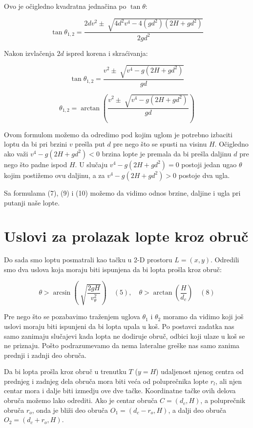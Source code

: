 \documentclass[a4paper, 12pt]{article}
\begin{document}
Ovo je očigledno kvadratna jednačina po $\tan \theta$:

\[ \tan \theta_{1,2} = \dfrac{2 d v^2 \pm \sqrt[]{4 d^2 v^4 - 4 (g d^2)(2 H + g d^2)}}{2 g d^2} \]

Nakon izvlačenja $2d$ ispred korena i skraćivanja:

\[ \tan \theta_{1,2} = \dfrac{v^2 \pm \sqrt[]{v^4 - g(2 H + g d^2)}}{g d} \]

\begin{equation}
\theta_{1,2} = \arctan (\dfrac{v^2 \pm \sqrt[]{v^4 - g(2 H + g d^2)}}{g d})
\end{equation}

Ovom formulom možemo da odredimo pod kojim uglom je potrebno izbaciti loptu da bi pri brzini $v$ prešla put $d$ pre nego što se spusti na visinu $H$.
Očigledno ako važi $v^4 - g(2 H + g d^2) < 0$ brzina lopte je premala da bi prešla daljinu $d$ pre nego što padne ispod $H$. U slučaju $v^4 - g(2 H + g d^2) = 0$ postoji jedan ugao $\theta$ kojim postižemo ovu daljinu, a za $v^4 - g(2 H + g d^2) > 0$ postoje dva ugla.


Sa formulama (7), (9) i (10) možemo da vidimo odnos brzine, daljine i ugla pri putanji naše lopte.

\pagebreak



\section{Uslovi za prolazak lopte kroz obruč}

Do sada smo loptu posmatrali kao tačku u 2-D prostoru $L = (x,y)$. Odredili smo dva uslova koja moraju biti ispunjena da bi lopta prošla kroz obruč:

\[{\theta} > \arcsin(\sqrt[]{\dfrac{2 g H}{v_{\theta}^2}}) \quad (5), \quad {\theta} > \arctan(\dfrac{H}{d_c}) \quad (8) \]

Pre nego što se pozabavimo traženjem uglova $\theta_1$ i $\theta_2$ moramo da vidimo koji još uslovi moraju biti ispunjeni da bi lopta upala u koš. Po postavci zadatka nas samo zanimaju slučajevi kada lopta ne dodiruje obruč, odbici koji ulaze u koš se ne priznaju. Pošto podrazumevamo da nema lateralne greške nas samo zanima prednji i zadnji deo obruča.

Da bi lopta prošla kroz obruč u trenutku $T$ ($y = H$) udaljenost njenog centra od prednjeg i zadnjeg dela obruča mora biti veća od poluprečnika lopte $r_l$, ali njen centar mora i dalje biti izmedju ove dve tačke. Koordinatne tačke ovih delova obruča možemo lako odrediti. Ako je centar obruča $C = (d_c,H)$, a poluprečnik obruča $r_o$, onda je bliži deo obruča $O_1 = (d_c - r_o, H)$, a dalji deo obruča $O_2 = (d_c + r_o, H)$.
\end{document}
